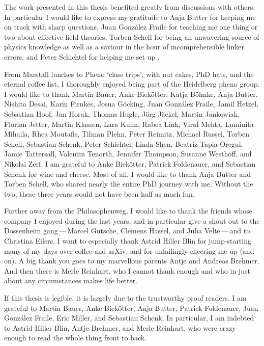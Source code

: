 The work presented in this thesis benefited greatly from discussions
with others. In particular I would like to express my gratitude to
Anja Butter for keeping me on track with sharp questions, Juan
Gonz\'alez Fraile for teaching me one thing or two about effective
field theories, Torben Schell for being an unwavering source of physics
knowledge as well as a saviour in the hour of incomprehensible linker
errors, and Peter Schichtel for helping me set up
.

From Marstall lunches to Pheno `class trips', with nut cakes, PhD
hats, and the eternal coffee list,
%
I thoroughly enjoyed being part of the Heidelberg pheno group.
%
%
I would like to thank Martin
Bauer, Anke Biek\"otter, Katja B\"ohnke, Anja Butter, Nishita Desai,
Karin Firnkes, Josua G\"ocking, Juan Gonz\'alez Fraile, Jamil Hetzel,
Sebastian Hoof, Jan Horak, Thomas Hugle, J\"org J\"ackel, Martin
Jankowiak, Florian Jetter, Martin Klassen, Lara Kuhn, Rabea Link,
Viraf Mehta, Luminita Mihaila, Rhea Moutafis, Tilman Plehn, Peter
Reimitz, Michael Russel, Torben Schell, Sebastian Schenk, Peter
Schichtel, Linda Shen, Beatriz Tapia Oregui, Jamie Tattersall,
Valentin Tenorth, Jennifer Thompson, Susanne Westhoff, and Nikolai
Zerf. I am grateful to Anke Biek\"otter, Patrick Foldenauer, and
Sebastian Schenk for wine and cheese. Most of
all, I would like to thank Anja Butter and Torben Schell, who shared
nearly the entire PhD journey with me. Without the two, these three
years would not have been half as much fun.

Further away from the Philosophenweg, I would like to thank the
friends whose company I enjoyed during the last years, and in
particular give a shout out to the Dossenheim gang\,---\,Marcel
Gutsche, Clemens Hassel, and Julia Velte\,---\,and to Christina
Eilers. I want to especially thank Astrid Hiller Blin for
jump-starting many of my days over coffee and arXiv, and for
unfailingly cheering me up (and on). A big thank you goes to my
marvellous parents Antje and Andreas Brehmer. And then there is Merle
Reinhart, who I cannot thank enough and who in just about any
circumstances makes life better.

If this thesis is legible, it is largely due to the trustworthy proof
readers. I am grateful to Martin Bauer, Anke Biek\"otter, Anja Butter,
Patrick Foldenauer, Juan Gonz\'alez Fraile, Eric Miller, and Sebastian
Schenk. In particular, I am indebted to Astrid Hiller Blin, Antje
Brehmer, and Merle Reinhart, who were crazy enough to read the whole
thing front to back.

